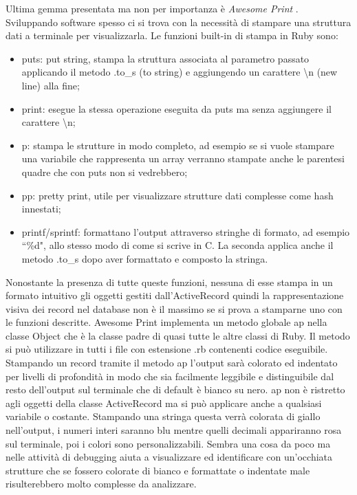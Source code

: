 \documentclass[target=bach,aauheader=,style=]{thud}
\begin{document}
Ultima gemma presentata ma non per importanza è \textit{Awesome Print} \cite{awesome_print_gem}. Sviluppando software spesso ci si trova con la necessità di stampare una struttura dati a terminale
per visualizzarla. Le funzioni built-in di stampa in Ruby sono:
\begin{itemize}
    \item puts: put string, stampa la struttura associata al parametro passato applicando il metodo .to\_s (to string) e aggiungendo un carattere \textbackslash n (new line) alla fine;
    \item print: esegue la stessa operazione eseguita da puts ma senza aggiungere il carattere \textbackslash n;
    \item p: stampa le strutture in modo completo, ad esempio se si vuole stampare una variabile che rappresenta un array verranno stampate anche le parentesi
          quadre che con puts non si vedrebbero;
    \item pp: pretty print, utile per visualizzare strutture dati complesse come hash innestati;
    \item printf/sprintf: formattano l'output attraverso stringhe di formato, ad esempio ``\%d", allo stesso modo di come si scrive in C.
          La seconda applica anche il metodo .to\_s dopo aver formattato e composto la stringa.
\end{itemize}
Nonostante la presenza di tutte queste funzioni, nessuna di esse stampa in un formato intuitivo gli oggetti gestiti dall'ActiveRecord quindi la rappresentazione
visiva dei record nel database non è il massimo se si prova a stamparne uno con le funzioni descritte. Awesome Print implementa un metodo globale ap nella classe Object che
è la classe padre di quasi tutte le altre classi di Ruby. Il metodo si può utilizzare in tutti i file con estensione .rb contenenti codice eseguibile.
Stampando un record tramite il metodo ap l'output sarà colorato ed indentato per livelli di profondità in modo che sia facilmente leggibile e distinguibile dal resto
dell'output sul terminale che di default è bianco su nero. ap non è ristretto agli oggetti della classe ActiveRecord ma si può applicare anche a qualsiasi variabile o costante.
Stampando una stringa questa verrà colorata di giallo nell'output, i numeri interi saranno blu mentre quelli decimali appariranno rosa sul terminale, poi i colori sono personalizzabili.
Sembra una cosa da poco ma nelle attività di debugging aiuta a visualizzare ed identificare con un'occhiata strutture che se fossero colorate di bianco e formattate o indentate male
risulterebbero molto complesse da analizzare.
\end{document}
